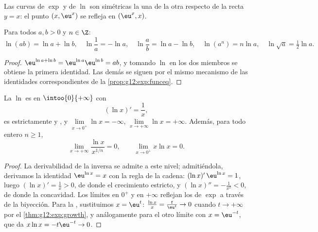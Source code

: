 \begin{omfigure}

{\small Las curvas de $\exp$ y de $\ln$ son simétricas la una de la otra
respecto de la recta $y = x$: el punto $(x, \eu^x)$ se refleja en
$(\eu^x, x)$.}
\end{omfigure}

\begin{proposition}\label{prop:g12:exp:lnalg}
Para todos $a, b > 0$ y $n \in \Z$:
\[
\ln(ab) = \ln a + \ln b, \quad
\ln\frac{1}{a} = -\ln a, \quad
\ln\frac{a}{b} = \ln a - \ln b, \quad
\ln(a^n) = n \ln a, \quad
\ln\sqrt{a} = \tfrac12 \ln a .
\]
\end{proposition}

\begin{proof}
$\eu^{\ln a + \ln b} = \eu^{\ln a}\eu^{\ln b} = ab$, y tomando $\ln$ en los
dos miembros se obtiene la primera identidad. Las demás se siguen por el
mismo mecanismo de las identidades correspondientes de la
\cref{prop:g12:exp:funceq}.
\end{proof}

\begin{proposition}\label{prop:g12:exp:lnanalytic}
La  $\ln$ es  en $\intoo{0}{+\infty}$ con
\[
(\ln x)' = \frac{1}{x},
\]
es estrictamente  y , y
$\lim\limits_{x\to0^+} \ln x = -\infty$,
$\lim\limits_{x\to+\infty} \ln x = +\infty$. Además, para todo entero
$n \geq 1$,
\[
\lim_{x\to+\infty} \frac{\ln x}{x^{1/n}} = 0, \qquad
\lim_{x\to0^+} x \ln x = 0 .
\]
\end{proposition}

\begin{proof}
La derivabilidad de la  inversa se admite a este nivel; admitiéndola,
derivamos la identidad $\eu^{\ln x} = x$ con la regla de la cadena:
$(\ln x)'\,\eu^{\ln x} = 1$, luego $(\ln x)' = \frac{1}{x} > 0$, de donde el
crecimiento estricto, y $(\ln x)'' = -\frac1{x^2} < 0$, de donde la
concavidad. Los límites en $0^+$ y en $+\infty$ reflejan los de $\exp$ a
través de la biyección. Para la , sustituimos
$x = \eu^{t}$: $\frac{\ln x}{x} = \frac{t}{\eu^t} \to 0$ cuando
$t \to +\infty$ por el \cref{thm:g12:exp:growth}, y análogamente para el
otro límite con $x = \eu^{-t}$, que da $x\ln x = -t\eu^{-t} \to 0$.
\end{proof}

